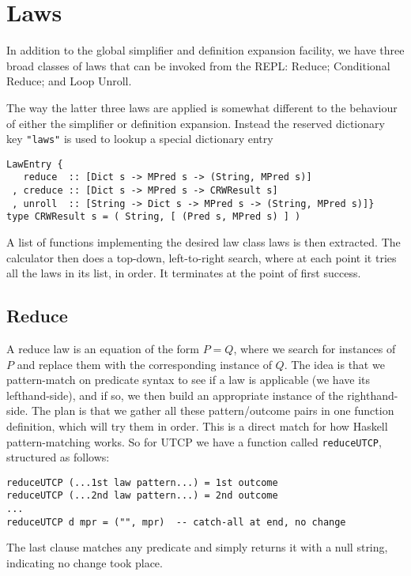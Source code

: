 \section{Laws}\label{sec:Laws}

In addition to the global simplifier and definition expansion facility,
we have three broad classes of laws that can be invoked from the REPL:
Reduce; Conditional Reduce; and Loop Unroll.

The way the latter three laws are applied is somewhat different
to the behaviour of either the simplifier or definition expansion.
Instead the reserved dictionary key \verb$"laws"$ is used
to lookup a special dictionary entry
\begin{verbatim}
LawEntry {
   reduce  :: [Dict s -> MPred s -> (String, MPred s)]
 , creduce :: [Dict s -> MPred s -> CRWResult s]
 , unroll  :: [String -> Dict s -> MPred s -> (String, MPred s)]}
type CRWResult s = ( String, [ (Pred s, MPred s) ] )
\end{verbatim}
A list of functions implementing the desired law class laws is then extracted.
The calculator then does a top-down, left-to-right search,
where at each point it tries all the laws in its list, in order.
It terminates at the point of first success.


\subsection{Reduce}

A reduce law is an equation of the form $P = Q$,
where we search for instances of $P$ and replace them with the
corresponding instance of $Q$.
The idea is that we pattern-match on predicate syntax
to see if a law is applicable (we have its lefthand-side),
and if so,
we then build an appropriate instance of the righthand-side.
The plan is that we gather all these pattern/outcome pairs
in one function definition,
which will try them in order.
This is a direct match for how Haskell pattern-matching works.
So for UTCP we have a function called \texttt{reduceUTCP},
structured as follows:
\begin{verbatim}
reduceUTCP (...1st law pattern...) = 1st outcome
reduceUTCP (...2nd law pattern...) = 2nd outcome
...
reduceUTCP d mpr = ("", mpr)  -- catch-all at end, no change
\end{verbatim}
The last clause matches any predicate
and simply returns it with a null string,
indicating no change took place.


